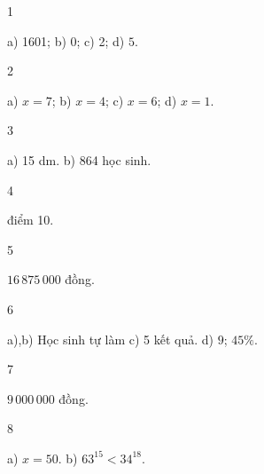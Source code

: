 \begin{Solbook}{1}
 \par \noindent a) 1601; \hspace {2cm} b) 0; \hspace {2cm} c) 2; \hspace {2cm} d) $5$. \hfill \qedEX 
\end{Solbook}
\begin{Solbook}{2}
 \par \noindent a) $x=7$; \hspace {1.5cm} b) $x=4$; \hspace {1.5cm} c) $x=6$; \hspace {1.5cm} d) $x=1$. \hfill \qedEX 
\end{Solbook}
\begin{Solbook}{3}
 \par \noindent a) 15 dm. \hspace {2cm} b) 864 học sinh. \hfill \qedEX 
\end{Solbook}
\begin{Solbook}{4}
 \par {} điểm 10. \hfill \qedEX 
\end{Solbook}
\begin{Solbook}{5}
 \par \noindent $16\,875\,000$ đồng. \hfill \qedEX 
\end{Solbook}
\begin{Solbook}{6}
 \par \noindent a),b) Học sinh tự làm \hspace {3cm} c) 5 kết quả. \hspace {3cm} d) $9$; $45\%$.  \hfill \qedEX 
\end{Solbook}
\begin{Solbook}{7}
 \par \noindent $9\,000\,000$ đồng.  \hfill \qedEX 
\end{Solbook}
\begin{Solbook}{8}
 \par \noindent a) $x=50$. \hspace {3cm} b) $63^{15}<34^{18} $.  \hfill \qedEX 
\end{Solbook}
